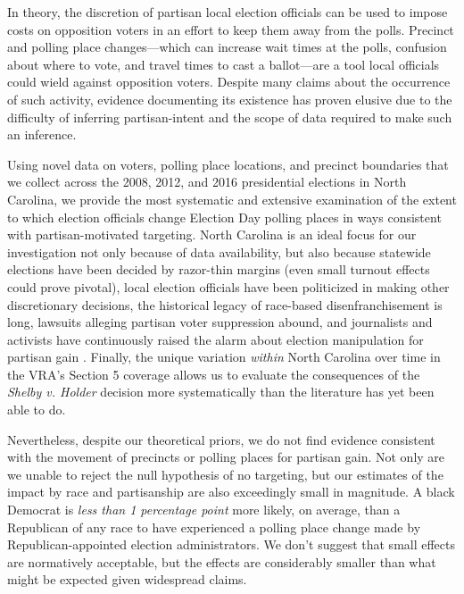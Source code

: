 \documentclass[12pt]{article}
\begin{document}
In theory, the discretion of partisan local election officials can be used to impose costs on opposition voters in an effort to keep them away from the polls.  Precinct and polling place changes---which can increase wait times at the polls, confusion about where to vote, and travel times to cast a ballot---are a tool local officials could wield against opposition voters.  Despite many claims about the occurrence of such activity, evidence documenting its existence has proven elusive due to the difficulty of inferring partisan-intent and the scope of data required to make such an inference.

Using novel data on voters, polling place locations, and precinct boundaries that we collect across the 2008, 2012, and 2016 presidential elections in North Carolina, we provide the most systematic and extensive examination of the extent to which election officials change Election Day polling places in ways consistent with partisan-motivated targeting. North Carolina is an ideal focus for our investigation not only because of data availability, but also because statewide elections have been decided by razor-thin margins (even small turnout effects could prove pivotal), local election officials have been politicized in making other discretionary decisions, the historical legacy of race-based disenfranchisement is long, lawsuits alleging partisan voter suppression abound, and journalists and activists have continuously raised the alarm about election manipulation for partisan gain \citep{jacobs}. Finally, the unique variation \emph{within} North Carolina over time in the VRA's Section 5 coverage allows us to evaluate the consequences of the \emph{Shelby v. Holder} decision more systematically than the literature has yet been able to do. %

Nevertheless, despite our theoretical priors, we do not find evidence consistent with the movement of precincts or polling places for partisan gain. Not only are we unable to reject the null hypothesis of no targeting, but our estimates of the impact by race and partisanship are also exceedingly small in magnitude.  A black Democrat is \emph{less than 1 percentage point} more likely, on average, than a Republican of any race to have experienced a polling place change made by Republican-appointed election administrators. We don't suggest that small effects are normatively acceptable, but the effects are considerably smaller than what might be expected given widespread claims.
\end{document}
